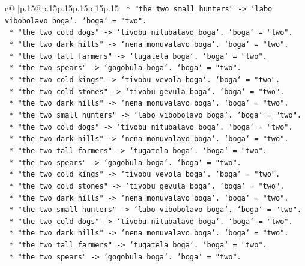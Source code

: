 \documentclass{article}
\begin{document}
{\begin{supertabular}{c@{$\;$}|p{.15\linewidth}@{}p{.15\linewidth}p{.15\linewidth}p{.15\linewidth}p{.15\linewidth}p{.15\linewidth}}
{{{\texttt{        *   "the two small hunters" {-}> `labo vibobolavo boga`. `boga` = "two".} \\
\texttt{        *   "the two cold dogs" {-}> `tivobu nitubalavo boga`. `boga` = "two".} \\
\texttt{        *   "the two dark hills" {-}> `nena monuvalavo boga`. `boga` = "two".} \\
\texttt{        *   "the two tall farmers" {-}> `tugatela boga`. `boga` = "two".} \\
\texttt{        *   "the two spears" {-}> `gogobula boga`. `boga` = "two".} \\
\texttt{        *   "the two cold kings" {-}> `tivobu vevola boga`. `boga` = "two".} \\
\texttt{        *   "the two cold stones" {-}> `tivobu gevula boga`. `boga` = "two".} \\
\texttt{        *   "the two dark hills" {-}> `nena monuvalavo boga`. `boga` = "two".} \\
\texttt{        *   "the two small hunters" {-}> `labo vibobolavo boga`. `boga` = "two".} \\
\texttt{        *   "the two cold dogs" {-}> `tivobu nitubalavo boga`. `boga` = "two".} \\
\texttt{        *   "the two dark hills" {-}> `nena monuvalavo boga`. `boga` = "two".} \\
\texttt{        *   "the two tall farmers" {-}> `tugatela boga`. `boga` = "two".} \\
\texttt{        *   "the two spears" {-}> `gogobula boga`. `boga` = "two".} \\
\texttt{        *   "the two cold kings" {-}> `tivobu vevola boga`. `boga` = "two".} \\
\texttt{        *   "the two cold stones" {-}> `tivobu gevula boga`. `boga` = "two".} \\
\texttt{        *   "the two dark hills" {-}> `nena monuvalavo boga`. `boga` = "two".} \\
\texttt{        *   "the two small hunters" {-}> `labo vibobolavo boga`. `boga` = "two".} \\
\texttt{        *   "the two cold dogs" {-}> `tivobu nitubalavo boga`. `boga` = "two".} \\
\texttt{        *   "the two dark hills" {-}> `nena monuvalavo boga`. `boga` = "two".} \\
\texttt{        *   "the two tall farmers" {-}> `tugatela boga`. `boga` = "two".} \\
\texttt{        *   "the two spears" {-}> `gogobula boga`. `boga` = "two".} \\
}}}
\end{supertabular}}
\end{document}
